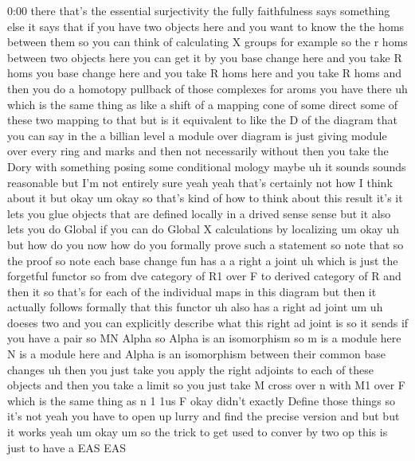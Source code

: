 \begin{unfinished}{0:00}
there  that's  the  essential  surjectivity
the  fully  faithfulness  says  something
else  it  says  that  if  you  have  two
objects  here  and  you  want  to  know  the
the  homs  between  them  so  you  can  think
of  calculating  X  groups  for  example  so
the  r  homs  between  two  objects  here  you
can  get  it  by  you  base  change  here  and
you  take  R  homs  you  base  change  here  and
you  take  R  homs  here  and  you  take  R  homs
and  then  you  do  a  homotopy  pullback  of
those  complexes  for  aroms  you  have  there
uh  which  is  the  same  thing  as  like  a
shift  of  a  mapping  cone  of  some  direct
some  of  these  two  mapping  to  that  but  is
it  equivalent  to  like  the  D  of  the
diagram  that  you  can  say  in  the  a
billian  level  a  module  over  diagram  is
just  giving  module  over  every  ring  and
marks  and  then  not  necessarily  without
then  you  take  the  Dory  with  something
posing  some  conditional  mology  maybe  uh
it  sounds  sounds  reasonable  but  I'm  not
entirely  sure
yeah  yeah  that's  certainly  not  how  I
think  about  it  but  okay
um  okay  so  that's  kind  of  how  to  think
about  this  result  it's  it  lets  you  glue
objects  that  are  defined  locally  in  a
drived  sense  sense  but  it  also  lets  you
do  Global  if  you  can  do  Global  X
calculations  by  localizing
um
okay  uh  but  how  do  you  now  how  do  you
formally  prove  such  a  statement  so  note
that  so  the  proof  so
note  each  base  change
fun  has  a  a  right  a
joint
uh  which  is  just  the  forgetful  functor
so  from  dve  category  of  R1  over  F  to
derived  category  of  R  and  then  it  so
that's  for  each  of  the  individual  maps
in  this  diagram  but  then  it  actually
follows  formally  that  this  functor  uh
also  has  a  right  ad  joint
um
uh  doeses
two  and  you  can  explicitly  describe  what
this  right  ad  joint  is  so  it  sends  if
you  have  a  pair  so
MN  Alpha  so  Alpha  is  an  isomorphism  so  m
is  a  module  here  N  is  a  module  here  and
Alpha  is  an  isomorphism  between  their
common  base
changes
uh  then  you  just  take  you  apply  the
right  adjoints  to  each  of  these  objects
and  then  you  take  a  limit  so  you  just
take  M  cross  over  n  with  M1  over  F  which
is  the  same  thing  as  n  1  1us
F  okay  didn't  exactly  Define  those
things  so  it's
not  yeah  you  have  to  open  up  lurry  and
find  the  precise  version  and  but  but  it
works  yeah  um
okay
um  so  the  trick  to  get  used  to  conver  by
two  op  this  is  just  to  have  a  EAS  EAS

\end{unfinished}

